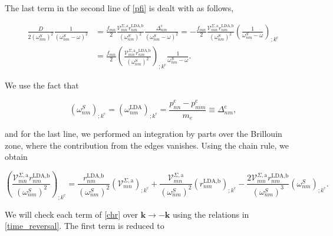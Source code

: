 \documentclass[10pt]{article}
\begin{document}
The last term in the second line of \eqref{pfi} is dealt with as follows,

\begin{align}\label{dresn}
\frac{D}{2(\omega^S_{nm})^2}\frac{1}{(\omega^S_{nm}-\omega)^2} 
&= \frac{f_{mn}}{2}\frac{\mathcal{V}^{\Sigma,\text{a}}_{mn}r^{\text{LDA,b}}_{nm}}{(\omega^S_{nm})^2}\frac{\Delta^{\text{c}}_{nm}}{(\omega^S_{nm}-\omega)^2} = -\frac{f_{mn}}{2}\frac{\mathcal{V}^{\Sigma,\text{a}}_{mn}r^{\text{LDA,b}}_{nm}}{(\omega^S_{nm})^2}\left(\frac{1}{\omega^S_{nm}-\omega}\right)_{;k^{\text{c}}}\nonumber\\
&= \frac{f_{mn}}{2}\left(\frac{\mathcal{V}^{\Sigma,\text{a}}_{mn}r^{\text{LDA,b}}_{nm}}{(\omega^S_{nm})^2}\right)_{;k^{\text{c}}}\frac{1}{\omega^S_{nm}-\omega}.
\end{align} 

We use the fact that

\begin{equation}\label{wk}
(\omega^S_{nm})_{;k^{\text{c}}}=(\omega^\text{LDA}_{nm})_{;k^{\text{c}}} = \frac{p_{nn}^{\text{c}}-p_{mm}^{\text{c}}}{m_{e}} \equiv \Delta_{nm}^{\text{c}},
\end{equation}

and for the last line, we performed an integration by parts over the Brillouin zone, where the contribution from the edges vanishes. Using the chain rule, we obtain

\begin{equation}\label{chr}
\left(\frac{\mathcal{V}^{\Sigma,\text{a}}_{mn}r^{\text{LDA,b}}_{nm}}{(\omega^{S}_{nm})^2}\right)_{;k^{\text{c}}} = \frac{r^{\text{LDA,b}}_{nm}}{(\omega^{S}_{nm})^2}\left(\mathcal{V} ^{\Sigma,\text{a}}_{mn}\right)_{;k^{\text{c}}} + \frac{\mathcal{V}^{\Sigma,\text{a}}_{mn}}{(\omega^{S}_{nm})^2}\left(r^{\text{LDA,b}}_{nm}\right)_{;k^{\text{c}}} - \frac{2\mathcal{V}^{\Sigma,\text{a}}_{mn}r^{\text{LDA,b}}_{nm}}{(\omega^{S}_{nm})^3}\left(
\omega^{S}_{nm}\right)_{;k^{\text{c}}}.
\end{equation}

We will check each term of \eqref{chr} over $\mathbf{k} \rightarrow - \mathbf{k}$ using the relations in \eqref{time_reversal}. The first term is reduced to
\end{document}
